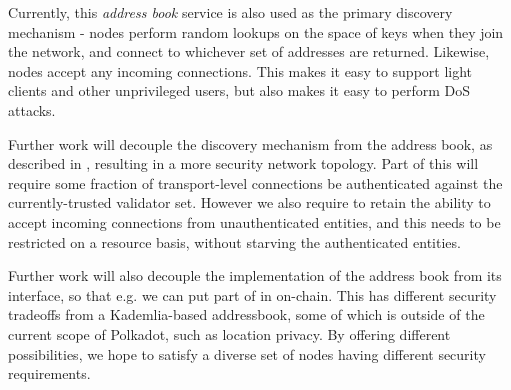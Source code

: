 Currently, this \emph{address book} service is also used as the primary discovery mechanism - nodes perform random lookups on the space of keys when they join the network, and connect to whichever set of addresses are returned. Likewise, nodes accept any incoming connections. This makes it easy to support light clients and other unprivileged users, but also makes it easy to perform DoS attacks.

Further work will decouple the discovery mechanism from the address book, as described in , resulting in a more security network topology. Part of this will require some fraction of transport-level connections be authenticated against the currently-trusted validator set. However we also require to retain the ability to accept incoming connections from unauthenticated entities, and this needs to be restricted on a resource basis, without starving the authenticated entities.

Further work will also decouple the implementation of the address book from its interface, so that e.g. we can put part of in on-chain. This has different security tradeoffs from a Kademlia-based addressbook, some of which is outside of the current scope of Polkadot, such as location privacy. By offering different possibilities, we hope to satisfy a diverse set of nodes having different security requirements.
